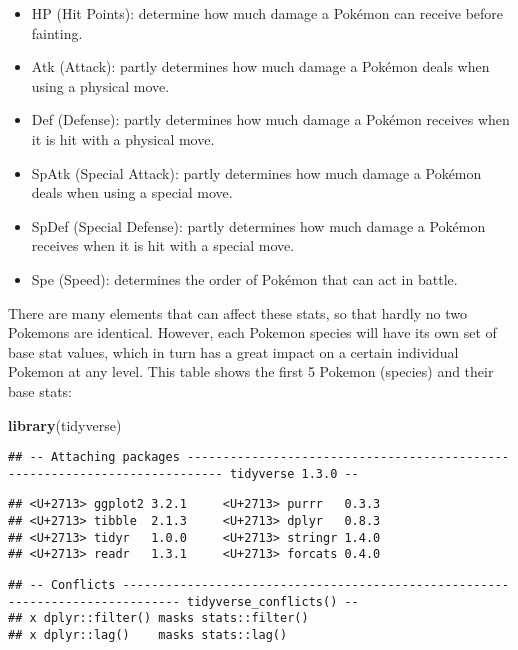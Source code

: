 \documentclass[]{article}
\newenvironment{Shaded}{\begin{snugshade}}{\end{snugshade}}
\newcommand{\KeywordTok}[1]{\textcolor[rgb]{0.13,0.29,0.53}{\textbf{#1}}}
\newcommand{\NormalTok}[1]{#1}
\providecommand{\tightlist}{%
  \setlength{\itemsep}{0pt}\setlength{\parskip}{0pt}}
\begin{document}
\begin{itemize}
\tightlist
\item
  HP (Hit Points): determine how much damage a Pokémon can receive
  before fainting.
\item
  Atk (Attack): partly determines how much damage a Pokémon deals when
  using a physical move.
\item
  Def (Defense): partly determines how much damage a Pokémon receives
  when it is hit with a physical move.
\item
  SpAtk (Special Attack): partly determines how much damage a Pokémon
  deals when using a special move.
\item
  SpDef (Special Defense): partly determines how much damage a Pokémon
  receives when it is hit with a special move.
\item
  Spe (Speed): determines the order of Pokémon that can act in battle.
\end{itemize}

There are many elements that can affect these stats, so that hardly no
two Pokemons are identical. However, each Pokemon species will have its
own set of base stat values, which in turn has a great impact on a
certain individual Pokemon at any level. This table shows the first 5
Pokemon (species) and their base stats:

\begin{Shaded}
\begin{Highlighting}[]
  \KeywordTok{library}\NormalTok{(tidyverse)}
\end{Highlighting}
\end{Shaded}

\begin{verbatim}
## -- Attaching packages --------------------------------------------------------------------------- tidyverse 1.3.0 --
\end{verbatim}

\begin{verbatim}
## <U+2713> ggplot2 3.2.1     <U+2713> purrr   0.3.3
## <U+2713> tibble  2.1.3     <U+2713> dplyr   0.8.3
## <U+2713> tidyr   1.0.0     <U+2713> stringr 1.4.0
## <U+2713> readr   1.3.1     <U+2713> forcats 0.4.0
\end{verbatim}

\begin{verbatim}
## -- Conflicts ------------------------------------------------------------------------------ tidyverse_conflicts() --
## x dplyr::filter() masks stats::filter()
## x dplyr::lag()    masks stats::lag()
\end{verbatim}
\end{document}
